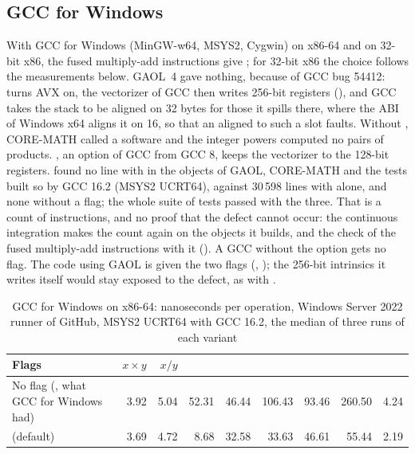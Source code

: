 \documentclass[12pt,a4paper,twoside,openright]{book}
\begin{document}
\subsection{GCC for Windows}\label{sec:install-gcc-windows}

With GCC for Windows (MinGW-w64, MSYS2, Cygwin) on x86-64 and on 32-bit x86,
the fused multiply-add instructions give
; for 32-bit x86 the choice follows
the measurements below.\newinvfive{} GAOL~4 gave nothing, because of GCC bug
54412:  turns AVX on, the vectorizer of GCC then writes 256-bit
registers (), and GCC takes the stack to be aligned on 32 bytes
for those it spills there, where the ABI of Windows x64 aligns it on 16, so
that an aligned  to such a slot faults. Without ,
CORE-MATH called a software  and the integer powers computed no
pairs of products. , an option of GCC from
GCC 8, keeps the vectorizer to the 128-bit registers.  found no line with  in the objects of GAOL,
CORE-MATH and the tests built so by GCC 16.2 (MSYS2 UCRT64), against 30\,598
lines with  alone, and none without a flag; the whole suite of
tests passed with the three. That is a count of instructions, and no proof
that the defect cannot occur: the continuous integration makes the count
again on the objects it builds, and the check of the fused multiply-add
instructions with it (). A GCC without the option gets no
flag. The code using GAOL is given the two flags (,
); the 256-bit intrinsics it writes itself would stay exposed
to the defect, as with .

\begin{table}[htbp]
  \centering\renewcommand{\arraystretch}{1.1}\footnotesize
  \setlength{\tabcolsep}{3pt}
  \begin{tabular}{L{3.5cm}rrrrrrrr}
    \hline
    Flags & $x \times y$ & $x / y$ &  &  &
     &  &  & \\
    \hline\hline
    No flag (, what GCC for Windows had) & 3.92 &
    5.04 & 52.31 & 46.44 & 106.43 & 93.46 & 260.50 & 4.24\\
     (default) & 3.69 & 4.72 & 8.68 &
    32.58 & 33.63 & 46.61 & 55.44 & 2.19\\
    \hline
  \end{tabular}
  \caption[GCC for Windows on x86-64: nanoseconds per operation (MSYS2 UCRT64, GCC 16.2)]{GCC for Windows on x86-64: nanoseconds per operation, Windows
    Server 2022 runner of GitHub, MSYS2 UCRT64 with GCC 16.2, the median of
    three runs of each variant}
  \label{tab:install-gcc-windows-x64}
\end{table}
\end{document}
